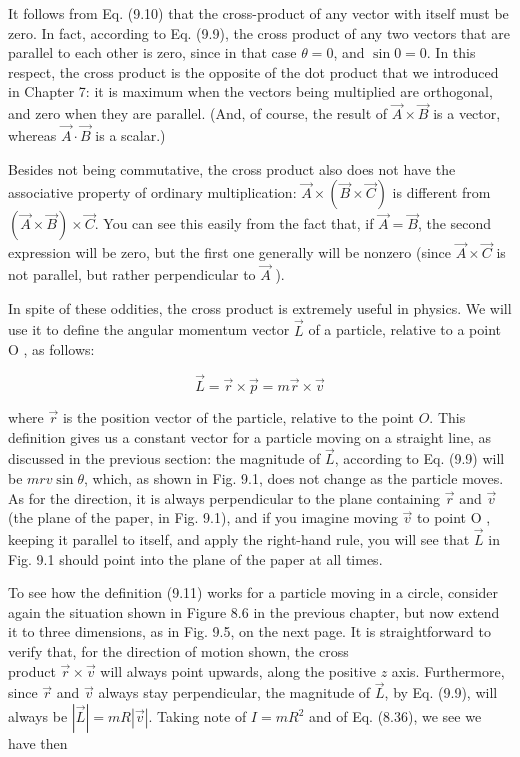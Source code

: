 \documentclass[10pt]{article}
\begin{document}
It follows from Eq. (9.10) that the cross-product of any vector with itself must be zero. In fact, according to Eq. (9.9), the cross product of any two vectors that are parallel to each other is zero, since in that case $\theta=0$, and $\sin 0=0$. In this respect, the cross product is the opposite of the dot product that we introduced in Chapter 7: it is maximum when the vectors being multiplied are orthogonal, and zero when they are parallel. (And, of course, the result of $\vec{A} \times \vec{B}$ is a vector, whereas $\vec{A} \cdot \vec{B}$ is a scalar.)

Besides not being commutative, the cross product also does not have the associative property of ordinary multiplication: $\vec{A} \times(\vec{B} \times \vec{C})$ is different from $(\vec{A} \times \vec{B}) \times \vec{C}$. You can see this easily from the fact that, if $\vec{A}=\vec{B}$, the second expression will be zero, but the first one generally will be nonzero (since $\vec{A} \times \vec{C}$ is not parallel, but rather perpendicular to $\vec{A}$ ).

In spite of these oddities, the cross product is extremely useful in physics. We will use it to define the angular momentum vector $\vec{L}$ of a particle, relative to a point O , as follows:


\begin{equation*}
\vec{L}=\vec{r} \times \vec{p}=m \vec{r} \times \vec{v} \tag{9.11}
\end{equation*}


where $\vec{r}$ is the position vector of the particle, relative to the point $O$. This definition gives us a constant vector for a particle moving on a straight line, as discussed in the previous section: the magnitude of $\vec{L}$, according to Eq. (9.9) will be $m r v \sin \theta$, which, as shown in Fig. 9.1, does not change as the particle moves. As for the direction, it is always perpendicular to the plane containing $\vec{r}$ and $\vec{v}$ (the plane of the paper, in Fig. 9.1), and if you imagine moving $\vec{v}$ to point O , keeping it parallel to itself, and apply the right-hand rule, you will see that $\vec{L}$ in Fig. 9.1 should point into the plane of the paper at all times.

To see how the definition (9.11) works for a particle moving in a circle, consider again the situation shown in Figure 8.6 in the previous chapter, but now extend it to three dimensions, as in Fig. 9.5, on the next page. It is straightforward to verify that, for the direction of motion shown, the cross\\
product $\vec{r} \times \vec{v}$ will always point upwards, along the positive $z$ axis. Furthermore, since $\vec{r}$ and $\vec{v}$ always stay perpendicular, the magnitude of $\vec{L}$, by Eq. (9.9), will always be $|\vec{L}|=m R|\vec{v}|$. Taking note of $I=m R^{2}$ and of Eq. (8.36), we see we have then
\end{document}

